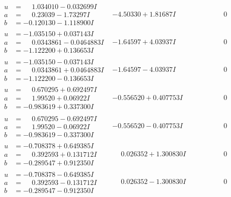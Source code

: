 \documentclass[1p]{elsarticle_modified}
\theoremstyle{definition}
\begin{document}
$$\begin{array}{c|c|c}
\begin{aligned}
u &= \phantom{-}1.034010 - 0.032699 I \\
a &= \phantom{-}0.23039 - 1.73297 I \\
b &= -0.120130 - 1.118900 I\end{aligned}
 & -4.50330 + 1.81687 I & \phantom{-0.000000 } 0 \\ \hline\begin{aligned}
u &= -1.035150 + 0.037143 I \\
a &= \phantom{-}0.0343861 - 0.0464883 I \\
b &= -1.122200 + 0.136653 I\end{aligned}
 & -1.64597 + 4.03937 I & \phantom{-0.000000 } 0 \\ \hline\begin{aligned}
u &= -1.035150 - 0.037143 I \\
a &= \phantom{-}0.0343861 + 0.0464883 I \\
b &= -1.122200 - 0.136653 I\end{aligned}
 & -1.64597 - 4.03937 I & \phantom{-0.000000 } 0 \\ \hline\begin{aligned}
u &= \phantom{-}0.670295 + 0.692497 I \\
a &= \phantom{-}1.99520 + 0.06922 I \\
b &= -0.983619 + 0.337300 I\end{aligned}
 & -0.556520 + 0.407753 I & \phantom{-0.000000 } 0 \\ \hline\begin{aligned}
u &= \phantom{-}0.670295 - 0.692497 I \\
a &= \phantom{-}1.99520 - 0.06922 I \\
b &= -0.983619 - 0.337300 I\end{aligned}
 & -0.556520 - 0.407753 I & \phantom{-0.000000 } 0 \\ \hline\begin{aligned}
u &= -0.708378 + 0.649385 I \\
a &= \phantom{-}0.392593 + 0.131712 I \\
b &= -0.289547 + 0.912350 I\end{aligned}
 & \phantom{-}0.026352 + 1.300830 I & \phantom{-0.000000 } 0 \\ \hline\begin{aligned}
u &= -0.708378 - 0.649385 I \\
a &= \phantom{-}0.392593 - 0.131712 I \\
b &= -0.289547 - 0.912350 I\end{aligned}
 & \phantom{-}0.026352 - 1.300830 I & \phantom{-0.000000 } 0 \\ \hline\begin{aligned}

\end{aligned}
\end{array}$$
\end{document}

